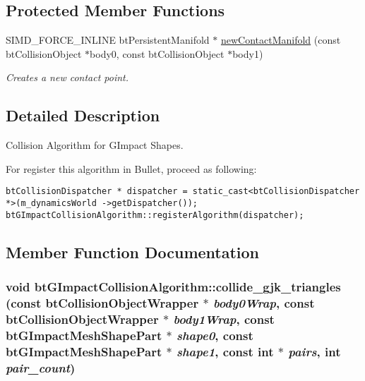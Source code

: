 \subsection*{Protected Member Functions}
\begin{CompactItemize}
\item 
\hypertarget{classbt_g_impact_collision_algorithm_39b6aae298182026902401b138ebd716}{
SIMD\_\-FORCE\_\-INLINE btPersistentManifold $\ast$ \hyperlink{classbt_g_impact_collision_algorithm_39b6aae298182026902401b138ebd716}{newContactManifold} (const btCollisionObject $\ast$body0, const btCollisionObject $\ast$body1)}
\label{classbt_g_impact_collision_algorithm_39b6aae298182026902401b138ebd716}

\begin{CompactList}\small\item\em Creates a new contact point. \item\end{CompactList}\end{CompactItemize}


\subsection{Detailed Description}
Collision Algorithm for GImpact Shapes. 

For register this algorithm in Bullet, proceed as following: 

\begin{Code}\begin{verbatim}btCollisionDispatcher * dispatcher = static_cast<btCollisionDispatcher *>(m_dynamicsWorld ->getDispatcher());
btGImpactCollisionAlgorithm::registerAlgorithm(dispatcher);
\end{verbatim}
\end{Code}

 

\subsection{Member Function Documentation}
\hypertarget{classbt_g_impact_collision_algorithm_1cc907bcb394f7a95d609b1b56a5490e}{
\subsubsection[collide\_\-gjk\_\-triangles]{\setlength{\rightskip}{0pt plus 5cm}void btGImpactCollisionAlgorithm::collide\_\-gjk\_\-triangles (const btCollisionObjectWrapper $\ast$ {\em body0Wrap}, \/  const btCollisionObjectWrapper $\ast$ {\em body1Wrap}, \/  const {\bf btGImpactMeshShapePart} $\ast$ {\em shape0}, \/  const {\bf btGImpactMeshShapePart} $\ast$ {\em shape1}, \/  const int $\ast$ {\em pairs}, \/  int {\em pair\_\-count})}}
\label{classbt_g_impact_collision_algorithm_1cc907bcb394f7a95d609b1b56a5490e}


